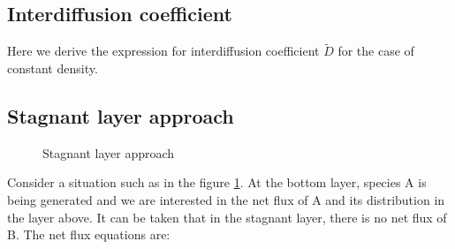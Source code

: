 \subsection{Interdiffusion coefficient}

Here we derive the expression for interdiffusion coefficient $\tilde{D}$ for the case of constant density.

\subsection{Stagnant layer approach}

\begin{figure}[h]
\begin{center}
\end{center}
\caption{Stagnant layer approach}
\label{stagnant}
\end{figure}

Consider a situation such as in the figure \ref{stagnant}. At the bottom layer,
species A is being generated and we are interested in the net flux of A and its
distribution in the layer above. It can be taken that in the stagnant layer,
there is no net flux of B. 
The net flux equations are:


